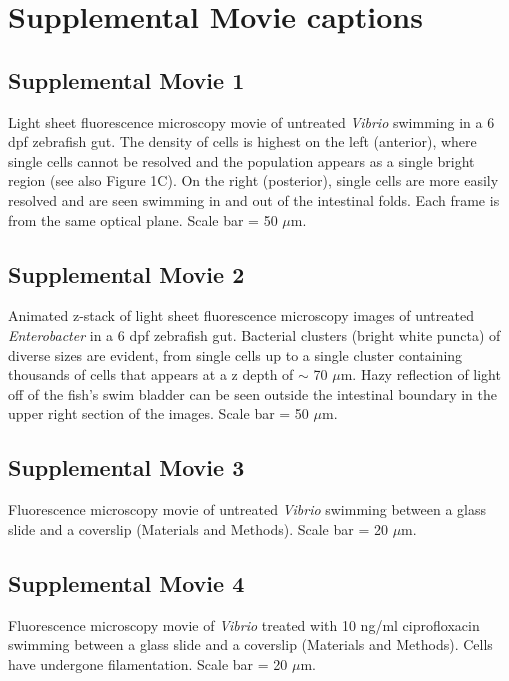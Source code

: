 {{{{{{{{{\renewcommand\thefigure{\arabic{figure}}    
\newpage

\section{Supplemental Movie captions}

\subsection*{Supplemental Movie 1} 
Light sheet fluorescence microscopy movie of untreated \textit{Vibrio} swimming in a 6 dpf zebrafish gut. The density of cells is highest on the left (anterior), where single cells cannot be resolved and the population appears as a single bright region (see also Figure 1C). On the right (posterior), single cells are more easily resolved and are seen swimming in and out of the intestinal folds. Each frame is from the same optical plane. Scale bar = 50 $\mu$m.

\subsection*{Supplemental Movie 2} 
Animated z-stack of light sheet fluorescence microscopy images of untreated \textit{Enterobacter} in a 6 dpf zebrafish gut. Bacterial clusters (bright white puncta) of diverse sizes are evident, from single cells up to a single cluster containing thousands of cells that appears at a z depth of $\sim$ 70 $\mu$m. Hazy reflection of light off of the fish's swim bladder can be seen outside the intestinal boundary in the upper right section of the images. Scale bar = 50 $\mu$m.

\subsection*{Supplemental Movie 3}
Fluorescence microscopy movie of untreated \textit{Vibrio} swimming between a glass slide and a coverslip (Materials and Methods). Scale bar = 20 $\mu$m.

\subsection*{Supplemental Movie 4}
Fluorescence microscopy movie of \textit{Vibrio} treated with 10 ng/ml ciprofloxacin swimming between a glass slide and a coverslip (Materials and Methods). Cells have undergone filamentation. Scale bar = 20 $\mu$m.

}}}}}}}}}
